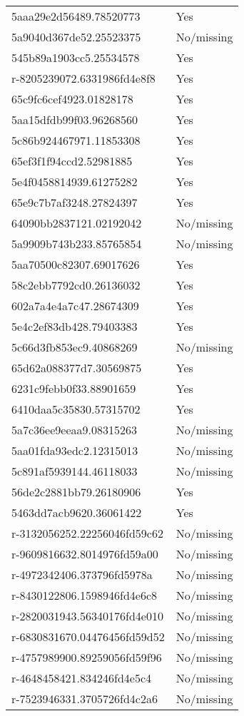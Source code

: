 \begin{tabular}{ll}
5aaa29e2d56489.78520773 & Yes \\
5a9040d367de52.25523375 & No/missing \\
545b89a1903cc5.25534578 & Yes \\
r-8205239072.6331986fd4e8f8 & Yes \\
65c9fc6cef4923.01828178 & Yes \\
5aa15dfdb99f03.96268560 & Yes \\
5c86b924467971.11853308 & Yes \\
65ef3f1f94ccd2.52981885 & Yes \\
5e4f0458814939.61275282 & Yes \\
65e9c7b7af3248.27824397 & Yes \\
64090bb2837121.02192042 & No/missing \\
5a9909b743b233.85765854 & No/missing \\
5aa70500c82307.69017626 & Yes \\
58c2ebb7792cd0.26136032 & Yes \\
602a7a4e4a7c47.28674309 & Yes \\
5e4c2ef83db428.79403383 & Yes \\
5c66d3fb853ec9.40868269 & No/missing \\
65d62a088377d7.30569875 & Yes \\
6231c9febb0f33.88901659 & Yes \\
6410daa5c35830.57315702 & Yes \\
5a7c36ee9eeaa9.08315263 & No/missing \\
5aa01fda93edc2.12315013 & No/missing \\
5c891af5939144.46118033 & No/missing \\
56de2c2881bb79.26180906 & Yes \\
5463dd7acb9620.36061422 & Yes \\
r-3132056252.22256046fd59c62 & No/missing \\
r-9609816632.8014976fd59a00 & No/missing \\
r-4972342406.373796fd5978a & No/missing \\
r-8430122806.1598946fd4e6c8 & No/missing \\
r-2820031943.56340176fd4e010 & No/missing \\
r-6830831670.04476456fd59d52 & No/missing \\
r-4757989900.89259056fd59f96 & No/missing \\
r-4648458421.834246fd4e5c4 & No/missing \\
r-7523946331.3705726fd4c2a6 & No/missing \\

\end{tabular}
